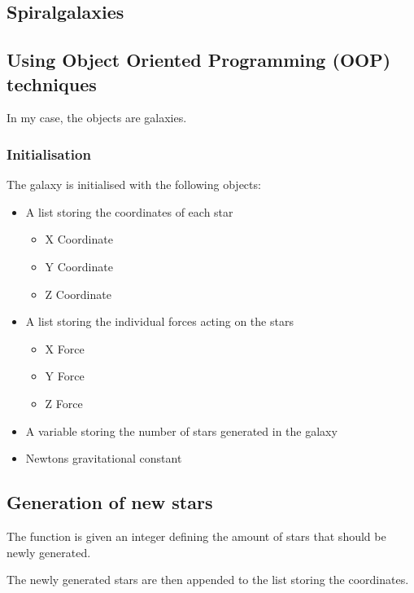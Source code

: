 \subsection{Spiralgalaxies}

\subsection{Using Object Oriented Programming (OOP) techniques}

In my case, the objects are galaxies.

\subsubsection{Initialisation}

The galaxy is initialised with the following objects:

\begin{itemize}
  \item A list storing the coordinates of each star
  \begin{itemize}
    \item X Coordinate
    \item Y Coordinate
    \item Z Coordinate
  \end{itemize}

  \item A list storing the individual forces acting on the stars
  \begin{itemize}
    \item X Force
    \item Y Force
    \item Z Force
  \end{itemize}

  \item A variable storing the number of stars generated in the galaxy

  \item Newtons gravitational constant
\end{itemize}

\subsection{Generation of new stars}

The function is given an integer defining the amount of stars that should be
newly generated.

The newly generated stars are then appended to the list storing the coordinates.

